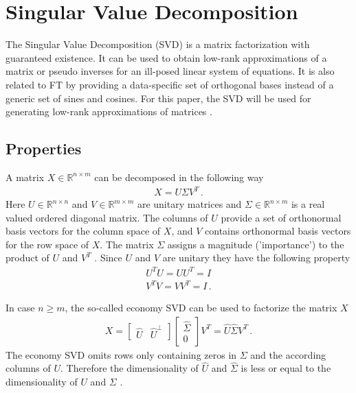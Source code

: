 \section{Singular Value Decomposition}
The Singular Value Decomposition (SVD) is a matrix factorization with guaranteed existence.
It can be used to obtain low-rank approximations of a matrix or pseudo inverses for an ill-posed linear system of equations.
It is also related to FT by providing a data-specific set of orthogonal bases instead of a generic set of sines and cosines. For this paper, the SVD will be used for generating low-rank approximations of matrices \cite{brunton_kutz_2019b}.
\subsection{Properties}
A matrix \(X \in \mathbb{R}^{n \times m}\) can be decomposed in the following way
\begin{gather}
X = U \Sigma V^{T} \,.
\end{gather}
Here \(U \in\mathbb{R}^{n \times n}\) and \(V \in\mathbb{R}^{m \times m}\) are unitary matrices and \(\Sigma \in \mathbb{R}^{n \times m}\) is a real valued ordered diagonal matrix.
The columns of \(U\) provide a set of orthonormal basis vectors for the column space of \(X\), and \(V\) contains orthonormal basis vectors for the row space of \(X\). The matrix \(\Sigma\) assigns a magnitude ('importance') to the product of \(U\) and \(V^{T}\)  \cite{brunton_kutz_2019a}.
Since \(U\) and \(V\) are unitary they have the following property \cite{SZABO2015385}
\begin{gather}
U^{T}U = UU^{T} = I \\
V^{T}V = VV^{T} = I \,.
\end{gather}

In case \(n \geq m\), the so-called economy SVD can be used to factorize the matrix \(X\)
\begin{gather}
X = \begin{bmatrix}
\hat{U} & \hat{U}^{\bot}
\end{bmatrix} 
\begin{bmatrix}
\hat{\Sigma} \\
0
\end{bmatrix}
V^{T} = \hat{U} \hat{\Sigma} V^{T} \,.
\end{gather} 
The economy SVD omits rows only containing zeros in \(\Sigma\) and the according columns of \(U\).
Therefore the dimensionality of \(\hat{U}\) and \(\hat{\Sigma}\) is less or equal to the dimensionality of \(U\) and \(\Sigma\) 
 \cite{brunton_kutz_2019b}.

